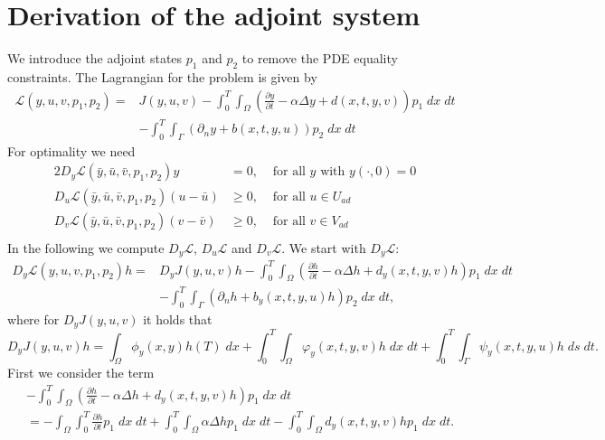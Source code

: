 \documentclass[
12pt, %
a4paper, %
onecolumn, %
portrait %
]{article}
\begin{document}
\section{Derivation of the adjoint system}
We introduce the adjoint states $p_1$ and $p_2$ to remove the PDE equality constraints. The Lagrangian for the problem is given by
\begin{align*}
\mathcal{L}(y,u,v,p_1, p_2) = & J(y,u,v) - \int_{0}^{T} \int_{\Omega} (\frac{\partial y}{\partial t} - \alpha \Delta y + d(x,t,y,v)) p_1 \; dx \; dt \\ & - \int_{0}^{T} \int_{\Gamma} (\partial_n y + b(x,t,y,u)) p_2 \; dx \; dt
\end{align*}
For optimality we need
\begin{alignat*}{2}
D_y \mathcal{L}(\bar{y},\bar{u},\bar{v},p_1, p_2) y & = 0, &\text{ for all } y \text{ with } y(\cdot, 0) = 0 \\
D_u \mathcal{L}(\bar{y},\bar{u},\bar{v},p_1, p_2) (u - \bar{u}) & \geq 0, &\text{ for all } u \in U_{ad} \\
D_v \mathcal{L}(\bar{y},\bar{u},\bar{v},p_1, p_2) (v - \bar{v}) & \geq 0, &\text{ for all } v \in V_{ad} \\
\end{alignat*}
In the following we compute $D_y \mathcal{L}$, $D_u \mathcal{L}$ and $D_v \mathcal{L}$. We start with $D_y \mathcal{L}$:
\begin{align*}
 D_y \mathcal{L}(y, u,v, p_1, p_2) h = & D_y J(y,u,v) h - \int_{0}^{T} \int_{\Omega} (\frac{\partial h}{\partial t} - \alpha \Delta h + d_y(x,t,y,v) h) p_1 \; dx \; dt \\ 
& - \int_{0}^{T} \int_{\Gamma} (\partial_n h + b_y(x,t,y,u) h) p_2 \; dx \; dt,
\end{align*} 
where for $D_y J(y,u,v)$ it holds that
\begin{equation}
D_y J(y,u,v) h = \int_{\Omega} \phi_y(x,y) h(T) \; dx + \int_{0}^{T} \int_{\Omega} \varphi_y(x,t,y, v) h \; dx \; dt 
+ \int_{0}^{T} \int_{\Gamma} \psi_y(x,t,y, u) h \; ds \; dt.
\end{equation}
First we consider the term
\begin{align*}
&- \int_{0}^{T} \int_{\Omega} (\frac{\partial h}{\partial t} - \alpha \Delta h + d_y(x,t,y,v) h) p_1 \; dx \; dt \\
& = - \int_{\Omega} \int_{0}^{T} \frac{\partial h}{\partial t} p_1 \; dx \; dt + \int_{0}^{T} \int_{\Omega} \alpha \Delta h p_1 \; dx \; dt - \int_{0}^{T} \int_{\Omega} d_y(x,t,y,v) h p_1 \; dx \; dt.
\end{align*}
\end{document}
